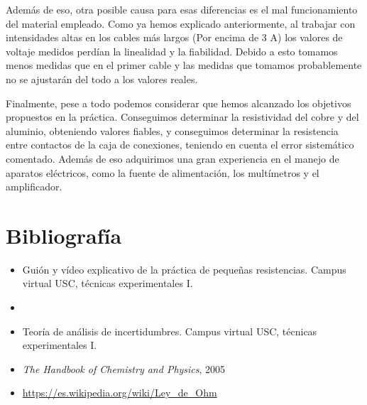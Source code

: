 \documentclass[a4paper,12pt,titlepage]{report}
\begin{document}
\par Además de eso, otra posible causa para esas diferencias es el mal funcionamiento del material empleado. Como ya hemos explicado anteriormente, al trabajar con intensidades altas en los cables más largos (Por encima de 3 A) los valores de voltaje medidos perdían la linealidad y la fiabilidad. Debido a esto tomamos menos medidas que en el primer cable y las medidas que tomamos probablemente no se ajustarán del todo a los valores reales.

\par Finalmente, pese a todo podemos considerar que hemos alcanzado los objetivos propuestos en la práctica. Conseguimos determinar la resistividad del cobre y del aluminio, obteniendo valores fiables, y conseguimos determinar la resistencia entre contactos de la caja de conexiones, teniendo en cuenta el error sistemático comentado. Además de eso adquirimos una gran experiencia en el manejo de aparatos eléctricos, como la fuente de alimentación, los multímetros y el amplificador.

\section{Bibliografía}

\begin{itemize}
    \item Guión y vídeo explicativo de la práctica de pequeñas resistencias. Campus virtual USC, técnicas experimentales I.
    \item \item Teoría de análisis de incertidumbres. Campus virtual USC, técnicas experimentales I.
    \item \textit{The Handbook of Chemistry and Physics}, 2005
    \item \url{https://es.wikipedia.org/wiki/Ley_de_Ohm}
\end{itemize}
\end{document}
